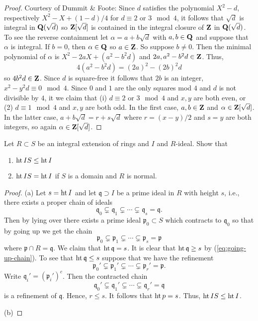 \begin{proof}
Courtesy of Dummit \& Foote: Since $d$ satisfies the polynomial $X^2-d$,
respectively $X^2-X+(1-d)/4$ for $d\equiv 2$ or $3\mod 4$, it follows that
$\sqrt{d}$ is integral in $\mathbf{Q}(\sqrt{d})$ so $\mathbf{Z}[\sqrt{d}]$ is contained
in the integral closure of $\mathbf{Z}$ in $\mathbf{Q}(\sqrt{d})$. To see the reverse
containment let $\alpha=a+b\sqrt{d}$ with $a,b\in\mathbf{Q}$ and suppose that
$\alpha$ is integral. If $b=0$, then $\alpha\in\mathbf{Q}$ so $a\in\mathbf{Z}$. So
suppose $b\neq 0$. Then the minimal polynomial of $\alpha$ is
$X^2-2aX+(a^2-b^2d)$ and $2a,a^2-b^2d\in\mathbf{Z}$. Thus,
\[
4(a^2-b^2d)=(2a)^2-(2b)^2d
\]
so $4b^2d\in\mathbf{Z}$. Since $d$ is square-free it follows that $2b$ is an
integer, $x^2-y^2d\equiv 0\mod 4$. Since $0$ and $1$ are the only squares
mod $4$ and $d$ is not divisible by $4$, it we claim that (i) $d\equiv 2$
or $3\mod 4$ and $x,y$ are both even, or (2) $d\equiv 1\mod 4$ and $x,y$
are both odd. In the first case, $a,b\in \mathbf{Z}$ and
$\alpha\in\mathbf{Z}[\sqrt{d}]$. In the latter case, $a+b\sqrt{d}=r+s\sqrt{d}$
where $r=(x-y)/2$ and $s=y$ are both integers, so again
$\alpha\in\mathbf{Z}[\sqrt{d}]$.
\end{proof}
\newpage
\begin{problem}
Let $R\subset S$ be an integral extension of rings and $I$ and
$R$-ideal. Show that
\begin{enumerate}[label=(\alph*)]
\item $\operatorname{ht} IS\leq\operatorname{ht} I$
\item $\operatorname{ht} IS=\operatorname{ht} I$ if $S$ is a domain and $R$ is normal.
\end{enumerate}
\end{problem}
\begin{proof}
(a) Let $s=\operatorname{ht} I$ and let $\mathfrak{q}\supset I$ be a prime ideal in $R$
with height $s$, i.e., there exists a proper chain of ideals
\[
\mathfrak{q}_0\subsetneq\mathfrak{q}_1\subsetneq\cdots\subsetneq\mathfrak{q}_s=\mathfrak{q}.
\]
Then by lying over there exists a prime ideal $\mathfrak{p}_0\subset S$ which
contracts to $\mathfrak{q}_0$ so that by going up we get the chain
\begin{equation}
\label{eq:going-up-chain}
\mathfrak{p}_0\subsetneq\mathfrak{p}_1\subsetneq\cdots\subsetneq\mathfrak{p}_s=\mathfrak{p}
\end{equation}
where $\mathfrak{p}\cap R=\mathfrak{q}$. We claim that
$\operatorname{ht}\mathfrak{q}=s$. It is clear that $\operatorname{ht}\mathfrak{q}\geq s$ by
(\ref{eq:going-up-chain}). To see that $\operatorname{ht}\mathfrak{q}\leq s$ suppose that
we have the refinement
\[
\mathfrak{p}_0'\subsetneq\mathfrak{p}_1'\subsetneq\cdots\subsetneq\mathfrak{p}_r'=\mathfrak{p}.
\]
Write $\mathfrak{q}_i'=(\mathfrak{p}_i')^c$. Then the contracted chain
\[
\mathfrak{q}_0'\subsetneq\mathfrak{q}_1'\subsetneq\cdots\subsetneq\mathfrak{q}_r'=\mathfrak{q}
\]
is a refinement of $\mathfrak{q}$. Hence, $r\leq s$. It follows that $\operatorname{ht}
p=s$. Thus, $\operatorname{ht} IS\leq\operatorname{ht} I$.

(b)
\end{proof}

